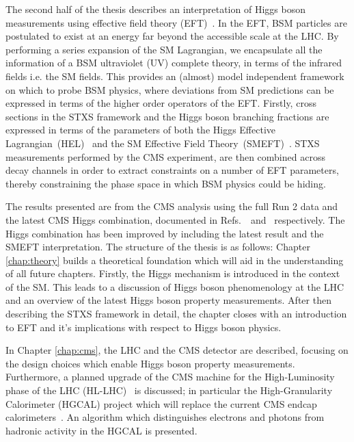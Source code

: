 The second half of the thesis describes an interpretation of Higgs boson measurements using effective field theory (EFT)~\cite{BUCHMULLER1986621,Hagiwara:1993qt,Giudice_2007,Grzadkowski2010,Contino:2013kra}. In the EFT, BSM particles are postulated to exist at an energy far beyond the accessible scale at the LHC. By performing a series expansion of the SM Lagrangian, we encapsulate all the information of a BSM ultraviolet (UV) complete theory, in terms of the infrared fields i.e. the SM fields. This provides an (almost) model independent framework on which to probe BSM physics, where deviations from SM predictions can be expressed in terms of the higher order operators of the EFT. Firstly, cross sections in the STXS framework and the Higgs boson branching fractions are expressed in terms of the parameters of both the Higgs Effective Lagrangian~(HEL)~\cite{Alloul:2013naa} and the SM Effective Field Theory~(SMEFT)~\cite{Brivio:2017vri}. STXS measurements performed by the CMS experiment, are then combined across decay channels in order to extract constraints on a number of EFT parameters, thereby constraining the phase space in which BSM physics could be hiding.

The results presented are from the CMS \Hgg analysis using the full Run 2 data and the latest CMS Higgs combination, documented in Refs.~\cite{CMS-PAS-HIG-19-015}~and~\cite{CMS-PAS-HIG-19-005} respectively. The Higgs combination has been improved by including the latest \Hgg result and the SMEFT interpretation. The structure of the thesis is as follows: Chapter {\color{blue}\ref{chap:theory}} builds a theoretical foundation which will aid in the understanding of all future chapters. Firstly, the Higgs mechanism is introduced in the context of the SM. This leads to a discussion of Higgs boson phenomenology at the LHC and an overview of the latest Higgs boson property measurements. After then describing the STXS framework in detail, the chapter closes with an introduction to EFT and it's implications with respect to Higgs boson physics.

In Chapter {\color{blue}\ref{chap:cms}}, the LHC and the CMS detector are described, focusing on the design choices which enable Higgs boson property measurements. Furthermore, a planned upgrade of the CMS machine for the High-Luminosity phase of the LHC (HL-LHC)~\cite{Contardo:2020886,ApollinariG.:2017ojx} is discussed; in particular the High-Granularity Calorimeter (HGCAL) project which will replace the current CMS endcap calorimeters~\cite{CERN-LHCC-2017-023}. An algorithm which distinguishes electrons and photons from hadronic activity in the HGCAL is presented.

